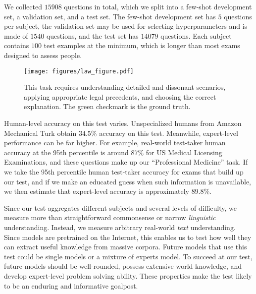 We collected $15908$ questions in total, which we split into a few-shot development set, a validation set, and a test set. The few-shot development set has $5$ questions per subject, the validation set may be used for selecting hyperparameters and is made of $1540$ questions, and the test set has $14079$ questions. Each subject contains $100$ test examples at the minimum, which is longer than most exams designed to assess people.

\begin{figure}[t]
    \centering
    \vspace{-17pt}
    \texttt{[image: figures/law\_figure.pdf]}
    \caption{This task requires understanding detailed and dissonant scenarios, applying appropriate legal precedents, and choosing the correct explanation. The green checkmark is the ground truth.}
    \label{fig:law}
    \vspace{-17pt}
\end{figure}

Human-level accuracy on this test varies. Unspecialized humans from Amazon Mechanical Turk obtain $34.5\%$ accuracy on this test. Meanwhile, expert-level performance can be far higher. For example, real-world test-taker human accuracy at the 95th percentile is around $87\%$ for US Medical Licensing Examinations, and these questions make up our ``Professional Medicine'' task. If we take the 95th percentile human test-taker accuracy for exams that build up our test, and if we make an educated guess when such information is unavailable, we then estimate that expert-level accuracy is approximately $89.8\%$.

Since our test aggregates different subjects and several levels of difficulty, we measure more than straightforward commonsense or narrow \emph{linguistic} understanding. Instead, we measure arbitrary real-world \emph{text} understanding.
Since models are pretrained on the Internet, this enables us to test how well they can extract useful knowledge from massive corpora. Future models that use this test could be single models or a mixture of experts model.
To succeed at our test, future models should be well-rounded, possess extensive world knowledge, and develop expert-level problem solving ability.
These properties make the test likely to be an enduring and informative goalpost.

